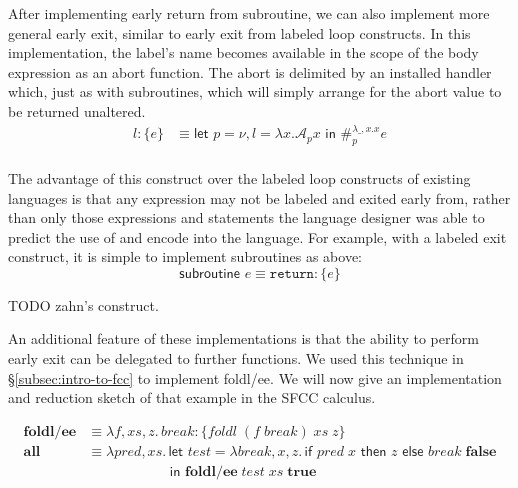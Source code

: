 \documentclass[11pt]{article}
\newcommand\x{\lambda x}
\newcommand{\letin}[2]{\textsf{let }#1\textsf{ in }#2}
\newcommand\A{\mathcal{A}}
\begin{document}
After implementing early return from  subroutine, we can also implement more general early exit, similar to early exit from labeled loop constructs.
In this implementation, the label's name becomes available in the scope of the body expression as an abort function.
The abort is delimited by an installed handler which, just as with subroutines, which will simply arrange for the abort value to be returned unaltered.
\begin{align*}
l\!: \{e\} &\equiv \letin{p = \nu, l = \x.\A_px}{\#_p^{\lambda \_,x.x}e} \\
\end{align*}

The advantage of this construct over the labeled loop constructs of existing languages is that any expression may not be labeled and exited early from, rather than only those expressions and statements the language designer was able to predict the use of and encode into the language.
For example, with a labeled exit construct, it is simple to implement subroutines as above:
$$\textsf{subroutine }e \equiv \texttt{return}\!:\{e\}$$



TODO zahn's construct.


An additional feature of these implementations is that the ability to perform early exit can be delegated to further functions.
We used this technique in \S\ref{subsec:intro-to-fcc} to implement foldl/ee.
We will now give an implementation and reduction sketch of that example in the SFCC calculus.

\begin{align*}
\textbf{foldl/ee} &\equiv
	\lambda f, xs, z.\,break\!: \{foldl\;(f\;break)\;xs\;z\} \\
\textbf{all} &\equiv
	\lambda pred,xs.\, \letin{test =
		\lambda break,x,z.\,\textsf{if }pred\;x
		\textsf{ then }z\textsf{ else }break\;\textbf{false}
	\\&\qquad\qquad\quad\;\;}{\textbf{foldl/ee}\;test\;xs\;\textbf{true}} \\
\end{align*}
\end{document}
